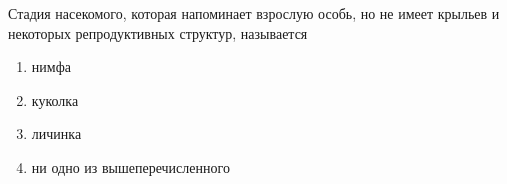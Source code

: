 
Стадия
насекомого, которая напоминает взрослую особь, но не имеет крыльев и некоторых
репродуктивных структур, называется

\begin{enumerate}
    \item нимфа 
    \item куколка 
    \item личинка 
    \item ни одно из вышеперечисленного
\end{enumerate}

\explanationSection

